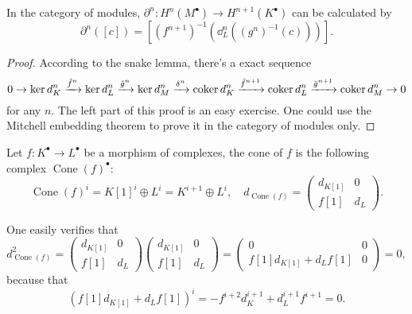 In the category of modules, $\partial^n:H^n(M^\bullet)\to H^{n+1}(K^\bullet)$ can be calculated by
\[
	\partial^n([c])=\left[(f^{n+1})^{-1}\left(\dd^n_L\left((g^n)^{-1}(c)\right)\right)\right].
\]

\begin{proof}
	According to the snake lemma, there's a exact sequence
	\[
		0\to \ker d_K^n\xrightarrow{\hat f^n} \ker d_L^n
		\xrightarrow{\hat g^n}
		\ker d_M^n \xrightarrow{\delta^n}
		\operatorname{coker} d_K^n\xrightarrow{\bar f^{n+1}} \operatorname{coker} d_L^n\xrightarrow{\bar g^{n+1}} \operatorname{coker} d_M^n \to 0
	\]
	for any $n$. The left part of this proof is an easy exercise.
	One could use the Mitchell embedding theorem to prove it in the category
	of modules only.
\end{proof}


\begin{definition}
Let $f:K^\bullet\to L^\bullet$ be a morphism of complexes,
the cone of $f$ is the following complex $\operatorname{Cone}(f)^\bullet$:
\[
	\operatorname{Cone}(f)^i=K[1]^i\oplus L^i=K^{i+1}\oplus L^i,\quad
	d_{\operatorname{Cone}(f)}=\begin{pmatrix}
		d_{K[1]}&0\\
		f[1]&d_L
	\end{pmatrix}.
\]
\end{definition}
One easily verifies that
\[
	d_{\operatorname{Cone}(f)}^2=\begin{pmatrix}
		d_{K[1]}&0\\
		f[1]&d_L
	\end{pmatrix}\begin{pmatrix}
		d_{K[1]}&0\\
		f[1]&d_L
	\end{pmatrix}
	=\begin{pmatrix}
		0&0\\
		f[1]d_{K[1]}+d_Lf[1]&0
	\end{pmatrix}
	=0,
\]
because that
\[
	(f[1]d_{K[1]}+d_Lf[1])^i =
	-f^{i+2}d_K^{i+1}+d_L^{i+1} f^{i+1}=0.
\]

